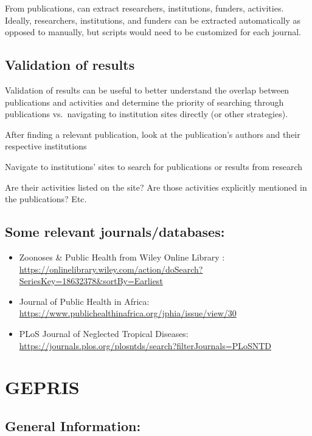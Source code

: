 \documentclass[
]{book}
\begin{document}
From publications, can extract researchers, institutions, funders, activities. Ideally, researchers, institutions, and funders can be extracted automatically as opposed to manually, but scripts would need to be customized for each journal.

\hypertarget{validation-of-results}{%
\subsection{Validation of results}\label{validation-of-results}}

Validation of results can be useful to better understand the overlap between publications and activities and determine the priority of searching through publications vs.~navigating to institution sites directly (or other strategies).

After finding a relevant publication, look at the publication's authors and their respective institutions

Navigate to institutions' sites to search for publications or results from research

Are their activities listed on the site? Are those activities explicitly mentioned in the publications? Etc.

\hypertarget{some-relevant-journalsdatabases}{%
\subsection{Some relevant journals/databases:}\label{some-relevant-journalsdatabases}}

\begin{itemize}
\item
  Zoonoses \& Public Health from Wiley Online Library : \url{https://onlinelibrary.wiley.com/action/doSearch?SeriesKey=18632378\&sortBy=Earliest}
\item
  Journal of Public Health in Africa: \url{https://www.publichealthinafrica.org/jphia/issue/view/30}
\item
  PLoS Journal of Neglected Tropical Diseases: \url{https://journals.plos.org/plosntds/search?filterJournals=PLoSNTD}
\end{itemize}

\hypertarget{update-gepris}{%
\section{GEPRIS}\label{update-gepris}}

\hypertarget{general-information-1}{%
\subsection{General Information:}\label{general-information-1}}
\end{document}
